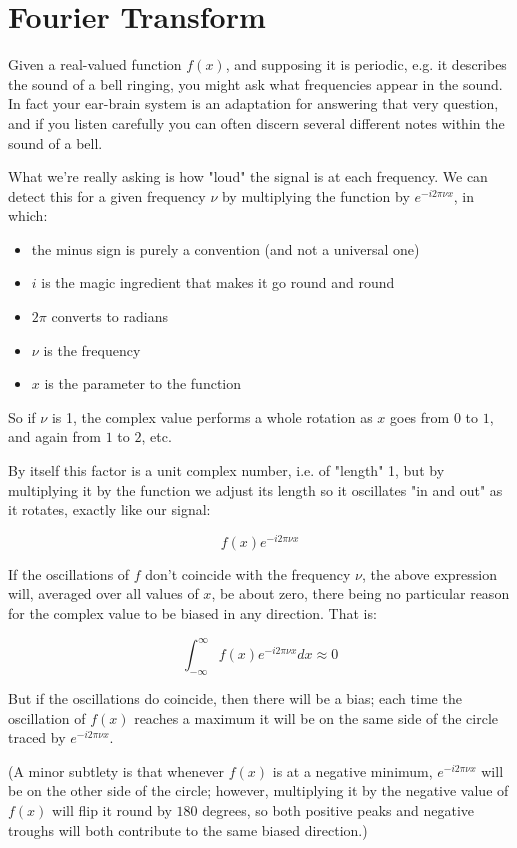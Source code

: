 \chapter{Fourier Transform}

Given a real-valued function $f(x)$, and supposing it is periodic, e.g. it describes the sound of a bell ringing, you might ask what frequencies appear in the sound. In fact your ear-brain system is an adaptation for answering that very question, and if you listen carefully you can often discern several different notes within the sound of a bell.

What we're really asking is how "loud" the signal is at each frequency. We can detect this for a given frequency $\nu$ by multiplying the function by $e^{-i2\pi\nu x}$, in which:

\begin{itemize} 
    \item the minus sign is purely a convention (and not a universal one)
    \item $i$ is the magic ingredient that makes it go round and round
    \item $2\pi$ converts to radians
    \item $\nu$ is the frequency
    \item $x$ is the parameter to the function
\end{itemize}

So if $\nu$ is 1, the complex value performs a whole rotation as $x$ goes from $0$ to $1$, and again from $1$ to $2$, etc.

By itself this factor is a unit complex number, i.e. of "length" 1, but by multiplying it by the function we adjust its length so it oscillates "in and out" as it rotates, exactly like our signal:

$$f(x)e^{-i2\pi\nu x}$$

If the oscillations of $f$ don't coincide with the frequency $\nu$, the above expression will, averaged over all values of $x$, be about zero, there being no particular reason for the complex value to be biased in any direction. That is:

$$\int_{-\infty}^{\infty} f(x)e^{-i2\pi\nu x} dx \approx 0 $$

But if the oscillations do coincide, then there will be a bias; each time the oscillation of $f(x)$ reaches a maximum it will be on the same side of the circle traced by $e^{-i2\pi\nu x}$.

(A minor subtlety is that whenever $f(x)$ is at a negative minimum, $e^{-i2\pi\nu x}$ will be on the other side of the circle; however, multiplying it by the negative value of $f(x)$ will flip it round by $180$ degrees, so both positive peaks and negative troughs will both contribute to the same biased direction.)

